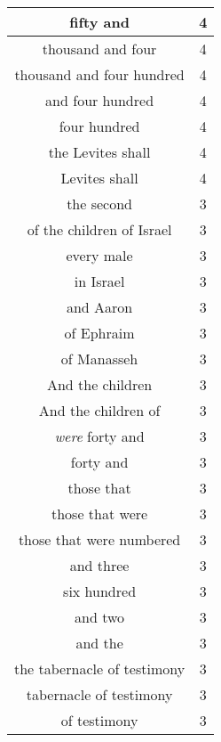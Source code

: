 \begin{center}
\begin{longtable}{|c|c|}
fifty and & 4\\ \hline 
thousand and four & 4\\ \hline 
thousand and four hundred & 4\\ \hline 
and four hundred & 4\\ \hline 
four hundred & 4\\ \hline 
the Levites shall & 4\\ \hline 
Levites shall & 4\\ \hline 
the second & 3\\ \hline 
of the children of Israel & 3\\ \hline 
every male & 3\\ \hline 
in Israel & 3\\ \hline 
and Aaron & 3\\ \hline 
of Ephraim & 3\\ \hline 
of Manasseh & 3\\ \hline 
And the children & 3\\ \hline 
And the children of & 3\\ \hline 
\emph{were} forty and & 3\\ \hline 
forty and & 3\\ \hline 
those that & 3\\ \hline 
those that were & 3\\ \hline 
those that were numbered & 3\\ \hline 
and three & 3\\ \hline 
six hundred & 3\\ \hline 
and two & 3\\ \hline 
and the & 3\\ \hline 
the tabernacle of testimony & 3\\ \hline 
tabernacle of testimony & 3\\ \hline 
of testimony & 3\\ \hline 
\end{longtable}
\end{center}





